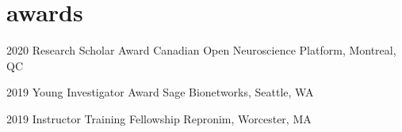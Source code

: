\documentclass[]{friggeri-cv} %
\begin{document}
\section{awards}

\begin{entrylist}
\vspace{-7pt}

\entry
{2020}
{Research Scholar Award}
{Canadian Open Neuroscience Platform, Montreal, QC}
{}
\vspace{-7pt}

\entry
{2019}
{Young Investigator Award}
{Sage Bionetworks, Seattle, WA}
{}
\vspace{-7pt}

\entry
{2019}
{Instructor Training Fellowship}
{Repronim, Worcester, MA}
{}
\vspace{-7pt}
\end{entrylist}
\end{document}
